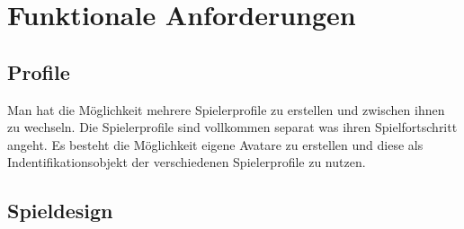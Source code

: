 \section{Funktionale Anforderungen}

\subsection{Profile}

\begin{requirements}
	Man hat die Möglichkeit mehrere Spielerprofile zu erstellen und zwischen ihnen zu wechseln.
	Die Spielerprofile sind vollkommen separat was ihren Spielfortschritt angeht. 
	Es besteht die Möglichkeit eigene Avatare zu erstellen und diese als Indentifikationsobjekt der verschiedenen Spielerprofile zu nutzen.
\end{requirements}

\subsection{Spieldesign}

